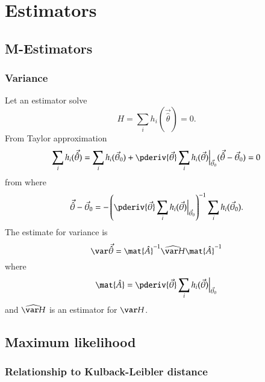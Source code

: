 \documentclass[a4paper]{article}
\numberwithin{equation}{subsection}
\begin{document}
\newpage
{}
\section{Estimators}
\label{sec:estimators}

\subsection{M-Estimators}
\label{sec:M-Estimators}

\subsubsection{Variance}
\label{sec:M-Estimators_variance}

Let an estimator solve
\begin{equation}
  H = \sum_{i} h_{i}(\vec{\hat{\theta}}) = 0.
\end{equation}
From Taylor approximation
\begin{equation}
  \sum_{i} h_{i}(\vec{\hat{\theta}}) 
  = 
  \sum_{i} h_{i}(\vec{\theta}_{0}) 
  +
  \pderiv{\vec{\theta}} 
  \sum_{i} h_{i}(\vec{\theta})\Big|_{\vec{\theta}_{0}}
  (\vec{\hat{\theta}} - \vec{\theta}_{0} )
  = 0
\end{equation}
from where
\begin{equation}
  \vec{\hat{\theta}} - \vec{\theta}_{0} 
  =
  -\left(
    \pderiv{\vec{\theta}} 
    \sum_{i} h_{i}(\vec{\theta})\Big|_{\vec{\theta}_{0}}
  \right)^{-1}    
  \sum_{i} h_{i}(\vec{\theta}_{0}).
\end{equation}
The estimate for variance is
\begin{equation}
  \label{eq:M-estimator_variance}
  \var \vec{\hat{\theta}} =
  \mat{\hat{A}}^{-1} \widehat{\var H} \mat{\hat{A}}^{-1}
\end{equation}
where
\begin{equation}
  \label{eq:M-estimators_A}
  \mat{\hat{A}} = 
  \pderiv{\vec{\theta}} 
  \sum_{i} h_{i}(\vec{\theta})\Big|_{\vec{\theta}_{0}}
\end{equation}
and $\widehat{\var H}$ is an estimator for $\var H$.


\subsection{Maximum likelihood}
\label{sec:maxlik}


\subsubsection{Relationship to Kulback-Leibler distance}
\end{document}
